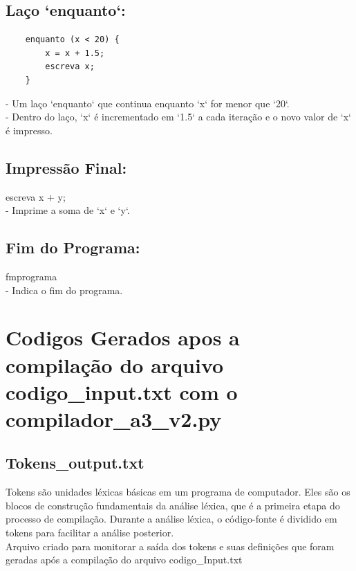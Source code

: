 \documentclass[a4paper,12pt]{article}
\begin{document}
\subsection{Laço `enquanto`:}
  \begin{verbatim} 
    enquanto (x < 20) {
        x = x + 1.5;
        escreva x;
    }
 \end{verbatim}    
    - Um laço `enquanto` que continua enquanto `x` for menor que `20`.
    \\
    - Dentro do laço, `x` é incrementado em `1.5` a cada iteração e o 
    novo valor de `x` é impresso.
\\    
\subsection{Impressão Final:}
    
    escreva x + y;
    \\
    - Imprime a soma de `x` e `y`.
\subsection{Fim do Programa:}
    
    fmprograma
    \\
    - Indica o fim do programa.

\section{Codigos Gerados apos a compilação do arquivo codigo\_input.txt 
com o  compilador\_a3\_v2.py}

\subsection{Tokens\_output.txt}
Tokens são unidades léxicas básicas em um programa de computador. Eles 
são os blocos de construção fundamentais da análise léxica, que é a 
primeira etapa do processo de compilação. Durante a análise léxica, o 
código-fonte é dividido em tokens para facilitar a análise posterior.\\

Arquivo criado para monitorar a saída dos tokens e suas definições que 
foram geradas após a compilação do arquivo codigo\_Input.txt
\end{document}
